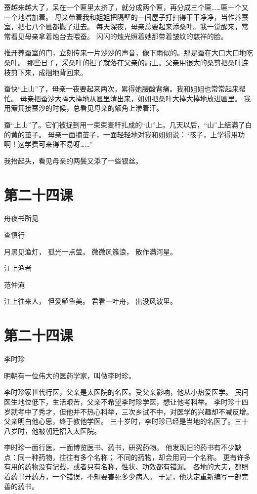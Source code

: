 \documentclass[12pt,UTF8]{ctexbook}
\begin{document}
蚕越来越大了，呆在一个匾里太挤了，就分成两个匾，再分成三个匾……匾一个又一个地增加着。
母亲带着我和姐姐把隔壁的一间屋子打扫得干干净净，当作养蚕室，把七八个匾都搬了进去。
每天深夜，母亲总要起来添桑叶。我一觉醒来，常常看见母亲拿着烛台去喂蚕。
闪闪的烛光照着她那带着皱纹的慈祥的脸。

推开养蚕室的门，立刻传来一片沙沙的声音，像下雨似的。那是蚕在大口大口地吃桑叶。
那些日子，采桑叶的担子就落在父亲的肩上。父亲用很大的桑剪把桑叶连枝剪下来，成捆地背回来。

蚕快“上山”了，母亲一夜要起来两次，累得她腰酸背痛。我和姐姐也常常起来帮忙。
母亲把蚕沙大捧大捧地从匾里清出来，姐姐把桑叶大捧大捧地放进匾里。
我用簸箕接蚕沙的时候，总看见母亲的额角上渗着汗。

蚕“上山”了。它们被捉到用一束束麦秆扎成的“山”上。几天以后，“山”上结满了白的黄的茧子。
母亲一面摘茧子，一面轻轻地对我和姐姐说：“孩子，上学得用功啊！这学费可来得不易呀……”

我抬起头，看见母亲的两鬓又添了一些银丝。

\section{第二十四课}

舟夜书所见 

查慎行

月黑见渔灯，
孤光一点萤。
微微风簇浪，
散作满河星。

江上渔者

范仲淹

江上往来人，
但爱鲈鱼美。
君看一叶舟，
出没风波里。

\section{第二十四课}

李时珍

明朝有一位伟大的医药学家，叫做李时珍。

李时珍家世代行医，父亲是太医院的名医。受父亲影响，他从小热爱医学。
民间医生地位低下，生活艰苦，父亲不希望李时珍学医，想让他考科举。
李时珍十四岁就考中了秀才，但他并不热心科举，三次乡试不中，对医学的兴趣却不减反增。
父亲明白他心思，终于教他学医。
三十岁时，李时珍已经是当地的名医了。三十八岁时，他被朝廷招入太医院。

李时珍一面行医，一面博览医书、药书，研究药物。
他发现旧的药书有不少缺点：同一种药物，往往有多个名称；
不同的药物，却会用同一个名称。
更有许多有用的药物没有记载，或者只有名称，性状、功效都有错漏。
各地的大夫，都照着药书开药方，一个错误，不知要害死多少病人。
于是，他决定重新编写一部完善的药书。
\end{document}
